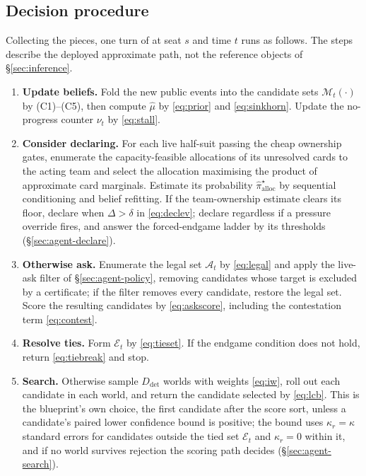 \subsection{Decision procedure}
\label{sec:agent-full}

Collecting the pieces, one turn of \sestina{} at seat $s$ and time $t$ runs as follows. The steps
describe the deployed approximate path, not the reference objects of \S\ref{sec:inference}.

\begin{enumerate}
\item \textbf{Update beliefs.} Fold the new public events into the candidate sets
  $\mathcal{M}_t(\cdot)$ by (C1)--(C5), then compute $\hat\mu$ by \eqref{eq:prior} and
  \eqref{eq:sinkhorn}. Update the no-progress counter $\nu_t$ by \eqref{eq:stall}.
\item \textbf{Consider declaring.} For each live half-suit passing the cheap ownership gates,
  enumerate the capacity-feasible allocations of its unresolved cards to the acting team and select
  the allocation maximising the product of approximate card marginals. Estimate its probability
  $\hat\pi_{\mathrm{alloc}}^\star$ by sequential conditioning and belief refitting. If the
  team-ownership estimate clears its floor, declare when $\Delta > \delta$ in \eqref{eq:declev};
  declare regardless if a pressure override fires, and answer the forced-endgame ladder by its
  thresholds (\S\ref{sec:agent-declare}).
\item \textbf{Otherwise ask.} Enumerate the legal set $\mathcal{A}_t$ by \eqref{eq:legal} and apply
  the live-ask filter of \S\ref{sec:agent-policy}, removing candidates whose target is excluded by a
  certificate; if the filter removes every candidate, restore the legal set. Score the resulting
  candidates by \eqref{eq:askscore}, including the contestation term \eqref{eq:contest}.
\item \textbf{Resolve ties.} Form $\mathcal{E}_t$ by \eqref{eq:tieset}. If the endgame condition does
  not hold, return \eqref{eq:tiebreak} and stop.
\item \textbf{Search.} Otherwise sample $D_{\mathrm{det}}$ worlds with weights \eqref{eq:iw}, roll out
  each candidate in each world, and return the candidate selected by \eqref{eq:lcb}. This is the
  blueprint's own choice, the first candidate after the score sort, unless a candidate's paired
  lower confidence bound is positive; the bound uses $\kappa_r = \kappa$ standard errors for
  candidates outside the tied set $\mathcal{E}_t$ and $\kappa_r = 0$ within it, and if no world
  survives rejection the \vfive{} scoring path decides (\S\ref{sec:agent-search}).
\end{enumerate}

